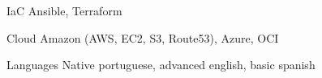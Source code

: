\begin{cvskills}
\cvskill
    {IaC} %
    {Ansible, Terraform} %

\cvskill
    {Cloud} %
    {Amazon (AWS, EC2, S3, Route53), Azure, OCI} %


  \cvskill
    {Languages} %
    {Native portuguese, advanced english, basic spanish} %

\end{cvskills}
